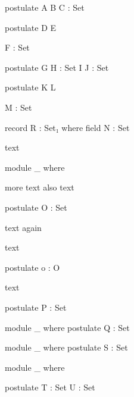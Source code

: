 \documentclass{article}
\begin{document}
\begin{code}
postulate
  A  B
      C : Set
\end{code}

\begin{code}
postulate
  D  E

      F : Set
\end{code}

\begin{code}
postulate
  G  H  : Set
  I
      J : Set
\end{code}

\begin{AgdaMultiCode}{2}
\begin{code}
postulate
  K  L
\end{code}
\begin{code}
      M : Set
\end{code}
\end{AgdaMultiCode}

\begin{code}
record R : Set₁ where
  field N :
            Set
\end{code}


\begin{AgdaAlign}
text \begin{code}        
module _ where
\end{code} more text
    also text  \begin{code}
    postulate O : Set  
  \end{code} text again

 text          \begin{code}            
    postulate o : O    
  \end{code}   text             
\end{AgdaAlign}

\begin{code}
postulate
 P : Set
\end{code}

\begin{code}
module _ where
 postulate
  Q : Set
\end{code}

\begin{code}
module _ where
         postulate
          S : Set
\end{code}

\begin{AgdaMultiCode}{2}
\begin{code}
module _ where
\end{code}
\begin{code}
  postulate T : Set
            U : Set
\end{code}
\end{AgdaMultiCode}
\end{document}
